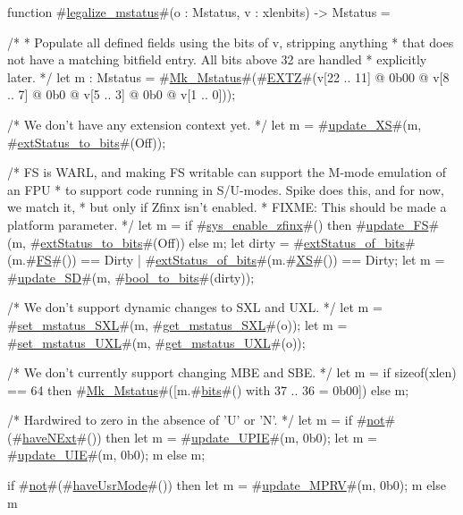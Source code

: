 function #\hyperref[sailRISCVzlegalizzezymstatus]{legalize\_mstatus}#(o : Mstatus, v : xlenbits) -> Mstatus = {
  /*
   * Populate all defined fields using the bits of v, stripping anything
   * that does not have a matching bitfield entry. All bits above 32 are handled
   * explicitly later.
   */
  let m : Mstatus = #\hyperref[sailRISCVzMkzyMstatus]{Mk\_Mstatus}#(#\hyperref[sailRISCVzEXTZ]{EXTZ}#(v[22 .. 11] @ 0b00 @ v[8 .. 7] @ 0b0 @ v[5 .. 3] @ 0b0 @ v[1 .. 0]));

  /* We don't have any extension context yet. */
  let m = #\hyperref[sailRISCVzupdatezyXS]{update\_XS}#(m, #\hyperref[sailRISCVzextStatuszytozybits]{extStatus\_to\_bits}#(Off));

  /* FS is WARL, and making FS writable can support the M-mode emulation of an FPU
   * to support code running in S/U-modes.  Spike does this, and for now, we match it,
   * but only if Zfinx isn't enabled.
   * FIXME: This should be made a platform parameter.
   */
  let m = if #\hyperref[sailRISCVzsyszyenablezyzzfinx]{sys\_enable\_zfinx}#() then #\hyperref[sailRISCVzupdatezyFS]{update\_FS}#(m, #\hyperref[sailRISCVzextStatuszytozybits]{extStatus\_to\_bits}#(Off)) else m;
  let dirty = #\hyperref[sailRISCVzextStatuszyofzybits]{extStatus\_of\_bits}#(m.#\hyperref[sailRISCVzFS]{FS}#()) == Dirty | #\hyperref[sailRISCVzextStatuszyofzybits]{extStatus\_of\_bits}#(m.#\hyperref[sailRISCVzXS]{XS}#()) == Dirty;
  let m = #\hyperref[sailRISCVzupdatezySD]{update\_SD}#(m, #\hyperref[sailRISCVzboolzytozybits]{bool\_to\_bits}#(dirty));

  /* We don't support dynamic changes to SXL and UXL. */
  let m = #\hyperref[sailRISCVzsetzymstatuszySXL]{set\_mstatus\_SXL}#(m, #\hyperref[sailRISCVzgetzymstatuszySXL]{get\_mstatus\_SXL}#(o));
  let m = #\hyperref[sailRISCVzsetzymstatuszyUXL]{set\_mstatus\_UXL}#(m, #\hyperref[sailRISCVzgetzymstatuszyUXL]{get\_mstatus\_UXL}#(o));

  /* We don't currently support changing MBE and SBE. */
  let m = if sizeof(xlen) == 64 then {
             #\hyperref[sailRISCVzMkzyMstatus]{Mk\_Mstatus}#([m.#\hyperref[sailRISCVzbits]{bits}#() with 37 .. 36 = 0b00])
          } else m;

  /* Hardwired to zero in the absence of 'U' or 'N'. */
  let m = if #\hyperref[sailRISCVznot]{not}#(#\hyperref[sailRISCVzhaveNExt]{haveNExt}#()) then {
             let m = #\hyperref[sailRISCVzupdatezyUPIE]{update\_UPIE}#(m, 0b0);
             let m = #\hyperref[sailRISCVzupdatezyUIE]{update\_UIE}#(m, 0b0);
             m
          } else m;

  if #\hyperref[sailRISCVznot]{not}#(#\hyperref[sailRISCVzhaveUsrMode]{haveUsrMode}#()) then {
    let m = #\hyperref[sailRISCVzupdatezyMPRV]{update\_MPRV}#(m, 0b0);
    m
  } else m
}
